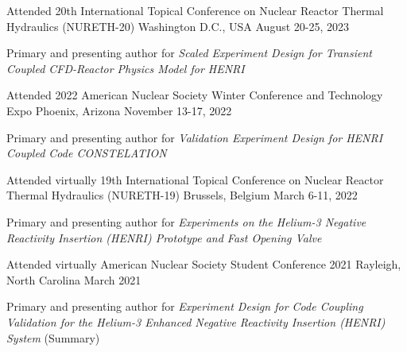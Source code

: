 \begin{cventries}



    \cventry
    {Attended} %
    {20th International Topical Conference on Nuclear Reactor Thermal Hydraulics (NURETH-20)} %
    {Washington D.C., USA} %
    {August 20-25, 2023} %
    {
    \begin{cvitems}
        \item{Primary and presenting author for \textit{Scaled Experiment Design for Transient Coupled CFD-Reactor Physics Model for HENRI}}
    \end{cvitems}
    }


    \cventry
    {Attended} %
    {2022 American Nuclear Society Winter Conference and Technology Expo} %
    {Phoenix, Arizona} %
    {November 13-17, 2022} %
    {
    \begin{cvitems}
        \item{Primary and presenting author for \textit{Validation Experiment Design for HENRI Coupled Code CONSTELATION}}
    \end{cvitems}
    }

    \cventry
    {Attended virtually} %
    {19th International Topical Conference on Nuclear Reactor Thermal Hydraulics (NURETH-19)} %
    {Brussels, Belgium} %
    {March 6-11, 2022} %
    {
    \begin{cvitems}
        \item{Primary and presenting author for \textit{Experiments on the Helium-3 Negative Reactivity Insertion (HENRI) Prototype and Fast Opening Valve}}
    \end{cvitems}
    }

    \cventry
    {Attended virtually} %
    {American Nuclear Society Student Conference 2021} %
    {Rayleigh, North Carolina} %
    {March 2021} %
    {
    \begin{cvitems}
        \item{Primary and presenting author for \textit{Experiment Design for Code Coupling Validation for the Helium-3 Enhanced Negative Reactivity Insertion (HENRI) System} (Summary)}
    \end{cvitems}
    }


\end{cventries}
